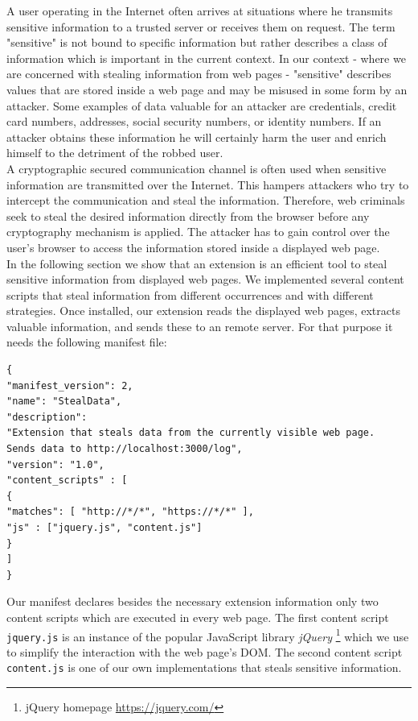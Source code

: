 A user operating in the Internet often arrives at situations where he transmits sensitive information to a trusted server or receives them on request. The term "sensitive" is not bound to specific information but rather describes a class of information which is important in the current context. In our context - where we are concerned with stealing information from web pages - "sensitive" describes values that are stored inside a web page and may be misused in some form by an attacker. Some examples of data valuable for an attacker are credentials, credit card numbers, addresses, social security numbers, or identity numbers. If an attacker obtains these information he will certainly harm the user and enrich himself to the detriment of the robbed user. \\

A cryptographic secured communication channel is often used when sensitive information are transmitted over the Internet. This hampers attackers who try to intercept the communication and steal the information. Therefore, web criminals seek to steal the desired information directly from the browser before any cryptography mechanism is applied. The attacker has to gain control over the user's browser to access the information stored inside a displayed web page. \\

In the following section we show that an extension is an efficient tool to steal sensitive information from displayed web pages. We implemented several content scripts that steal information from different occurrences and with different strategies. Once installed, our extension reads the displayed web pages, extracts valuable information, and sends these to an remote server. For that purpose it needs the following manifest file:

\begin{lstlisting}
{
"manifest_version": 2,
"name": "StealData",
"description": 
"Extension that steals data from the currently visible web page. 
Sends data to http://localhost:3000/log",
"version": "1.0",
"content_scripts" : [
{ 
"matches": [ "http://*/*", "https://*/*" ],
"js" : ["jquery.js", "content.js"] 
}
]
}
\end{lstlisting}

Our manifest declares besides the necessary extension information only two content scripts which are executed in every web page. The first content script \texttt{jquery.js} is an instance of the popular JavaScript library \textit{jQuery} \footnote{jQuery homepage \url{https://jquery.com/}} which we use to simplify the interaction with the web page's DOM. The second content script \texttt{content.js} is one of our own implementations that steals sensitive information.

